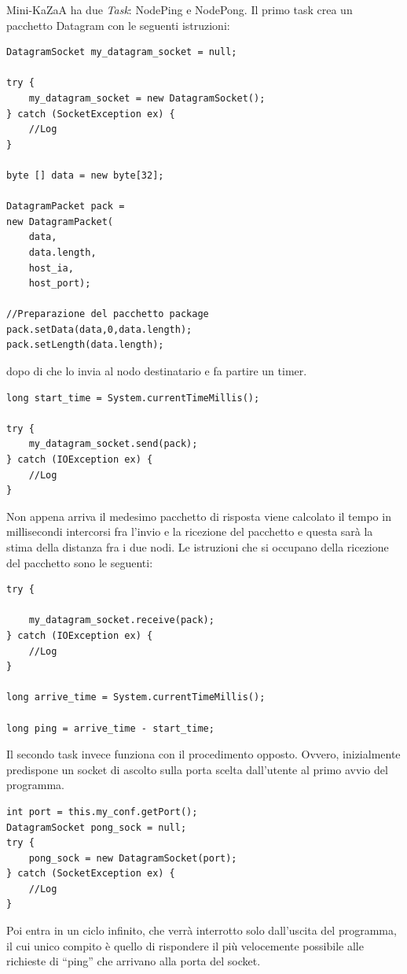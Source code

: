 Mini-KaZaA ha due \emph{Task}: NodePing e NodePong.
Il primo task crea un pacchetto Datagram con le seguenti istruzioni:
\begin{lstlisting}
DatagramSocket my_datagram_socket = null;

try {
	my_datagram_socket = new DatagramSocket();
} catch (SocketException ex) {
	//Log
}
		
byte [] data = new byte[32];

DatagramPacket pack = 
new DatagramPacket(
	data,
	data.length, 
	host_ia, 
	host_port);

//Preparazione del pacchetto package
pack.setData(data,0,data.length);
pack.setLength(data.length);
\end{lstlisting}
dopo di che lo invia al nodo destinatario e fa partire un timer.
\begin{lstlisting}
long start_time = System.currentTimeMillis();

try {
	my_datagram_socket.send(pack);
} catch (IOException ex) {
	//Log
}
\end{lstlisting}
Non appena arriva il medesimo pacchetto di risposta viene calcolato il tempo in millisecondi intercorsi fra l'invio e la ricezione del pacchetto e questa sarà la stima della distanza fra i due nodi.
Le istruzioni che si occupano della ricezione del pacchetto sono le seguenti:
\begin{lstlisting}
try {

	my_datagram_socket.receive(pack);
} catch (IOException ex) {
	//Log
}

long arrive_time = System.currentTimeMillis();

long ping = arrive_time - start_time;
\end{lstlisting}
Il secondo task invece funziona con il procedimento opposto. Ovvero, inizialmente predispone un socket di ascolto sulla porta scelta dall'utente al primo avvio del programma.
\begin{lstlisting}
int port = this.my_conf.getPort();
DatagramSocket pong_sock = null;
try {
	pong_sock = new DatagramSocket(port);
} catch (SocketException ex) {
	//Log
}
\end{lstlisting}
Poi entra in un ciclo infinito, che verrà interrotto solo dall'uscita del programma, il cui unico compito è quello di rispondere il più velocemente possibile alle richieste di ``ping'' che arrivano alla porta del socket.

